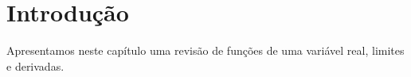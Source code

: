 \section{Introdução}

Apresentamos neste capítulo uma revisão de funções de uma variável real,
limites e derivadas.

